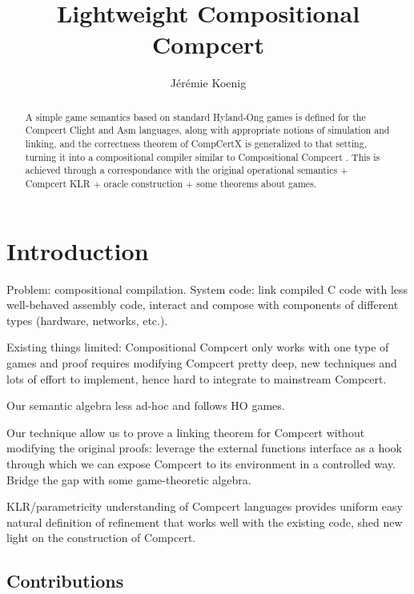 \documentclass[acmsmall,anonymous]{acmart}
\begin{document}
\title{Lightweight Compositional Compcert}

\author{J\'er\'emie Koenig}

\begin{abstract}
A simple game semantics based on standard Hyland-Ong games
is defined for the Compcert Clight and Asm languages,
along with appropriate notions of simulation and linking,
and the correctness theorem of CompCertX \citep{popl15}
is generalized to that setting,
turning it into a compositional compiler
similar to Compositional Compcert \citep{compcomp}.
This is achieved through
a correspondance with the original operational semantics +
Compcert KLR +
oracle construction +
some theorems about games.
\end{abstract}

\maketitle

\section{Introduction} %

Problem:
compositional compilation.
System code:
link compiled C code with less well-behaved assembly code,
interact and compose with components of different types
(hardware, networks, etc.).

Existing things limited:
Compositional Compcert only works with one type of games
and proof requires modifying Compcert pretty deep,
new techniques and lots of effort to implement,
hence hard to integrate to mainstream Compcert.

Our semantic algebra less ad-hoc and follows HO games.

Our technique allow us to prove a linking theorem for Compcert
without modifying the original proofs:
leverage the external functions interface as a hook
through which we can expose Compcert to its environment in a controlled way.
Bridge the gap with some game-theoretic algebra.

KLR/parametricity understanding of Compcert languages provides
uniform easy natural definition of refinement
that works well with the existing code,
shed new light on the construction of Compcert.

\subsection{Contributions}
\end{document}
